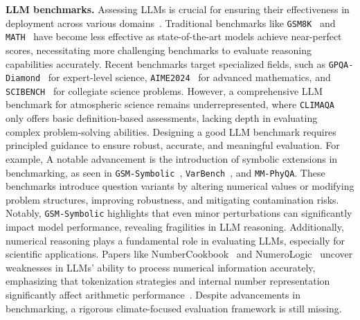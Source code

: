 




\textbf{LLM benchmarks.}
\label{sec:llm_benchmarks}
Assessing LLMs is crucial for ensuring their effectiveness in deployment across various domains~\cite{liang2022holistic}. Traditional benchmarks like \texttt{GSM8K}~\cite{cobbe2021training} and \texttt{MATH}~\cite{hendrycks2021measuring} have become less effective as state-of-the-art models achieve near-perfect scores, necessitating more challenging benchmarks to evaluate reasoning capabilities accurately.
Recent benchmarks target specialized fields, such as \texttt{GPQA-Diamond}~\cite{rein2023gpqa} for expert-level science, \texttt{AIME2024}~\cite{MAAInvitational2024} for advanced mathematics, and \texttt{SCIBENCH}~\cite{wang2023scibench} for collegiate science problems. 
However, a comprehensive LLM benchmark for atmospheric science remains underrepresented, where \texttt{CLIMAQA}~\cite{manivannan2024climaqa} only offers basic definition-based assessments, lacking depth in evaluating complex problem-solving abilities.
Designing a good LLM benchmark requires principled guidance to ensure robust, accurate, and meaningful evaluation. For example, A notable advancement is the introduction of symbolic extensions in benchmarking, as seen in \texttt{GSM-Symbolic}~\cite{mirzadeh2024gsm}, \texttt{VarBench}~\cite{qian2024varbench}, and \texttt{MM-PhyQA}. These benchmarks introduce question variants by altering numerical values or modifying problem structures, improving robustness, and mitigating contamination risks. Notably, \texttt{GSM-Symbolic} highlights that even minor perturbations can significantly impact model performance, revealing fragilities in LLM reasoning.
Additionally, numerical reasoning plays a fundamental role in evaluating LLMs, especially for scientific applications. Papers like NumberCookbook~\cite{yang2024number} and NumeroLogic~\cite{schwartz2024numerologic} uncover weaknesses in LLMs' ability to process numerical information accurately, emphasizing that tokenization strategies and internal number representation significantly affect arithmetic performance~\cite{singh2024tokenization}.
Despite advancements in benchmarking, a rigorous climate-focused evaluation framework is still missing. %

